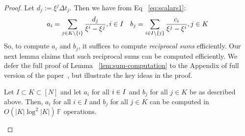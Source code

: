 \begin{proof}
    Let $d_j:=\xi^j \Delta t_j$. Then we have from Eq ~\eqref{eq:scalars1}:\\
    \begin{gather}\label{eq:scalars}
    a_i = \sum_{j\in K\setminus \{i\}}\frac{d_j}{\xi^i-\xi^j}, i\in I\quad
    b_j=  \sum_{i\in I\setminus \{j\}}\frac{c_i}{\xi^j - \xi^i}, j\in K
    \end{gather}
    So, to compute $a_i$ and $b_j$, it suffices to compute {\em reciprocal sums} efficiently. Our next lemma claims that
    such reciprocal sums can be computed efficiently.
    We defer the full proof of Lemma ~\ref{lem:sum-computation} to the Appendix of full version of the paper~\cite{full-ver}, but illustrate the key ideas in the proof.
    \begin{lemma}\label{lem:sum-computation}
    Let $I\subset K\subset [N]$ and let $a_i$ for all $i \in I$ and $b_j$ for all $j \in K$ be as described above.
    Then, $a_i$ for all $i \in I$ and $b_j$ for all $j \in K$ can be computed in $O(|K|\log^2|K|)\, \mathbb{F}$ operations.

\end{lemma}
\end{proof}

